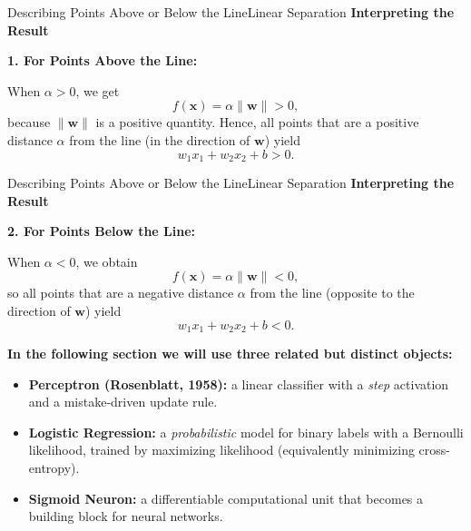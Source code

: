\documentclass[aspectratio=169]{beamer}
\begin{document}
%
%
\begin{frame}{Describing Points Above or Below the Line}{Linear Separation}
\textbf{Interpreting the Result}

\vspace{.3cm}

\textbf{1. For Points Above the Line:}

\vspace{0.3cm}

   When $\alpha > 0$, we get
   $$
   f(\mathbf{x}) = \alpha \|\mathbf{w}\| > 0,
   $$
   because $\|\mathbf{w}\|$ is a positive quantity. Hence, all points that are a positive distance $\alpha$ from the line (in the direction of $ \mathbf{w} $) yield
   $$
   w_1 x_1 + w_2 x_2 + b > 0.
   $$
\end{frame}
%
%
\begin{frame}{Describing Points Above or Below the Line}{Linear Separation}
\textbf{Interpreting the Result}

\vspace{0.3cm}

\textbf{2. For Points Below the Line:}

\vspace{0.3cm}

   When $\alpha < 0$, we obtain
   $$
   f(\mathbf{x}) = \alpha \|\mathbf{w}\| < 0,
   $$
   so all points that are a negative distance $\alpha$ from the line (opposite to the direction of $ \mathbf{w} $) yield
   $$
   w_1 x_1 + w_2 x_2 + b < 0.
   $$
\end{frame}
%
%
\begin{frame}{}
\textbf{In the following section we will use three related but distinct objects:}
\begin{itemize}
  \item \textbf{Perceptron (Rosenblatt, 1958):} a linear classifier with a \emph{step} activation and a mistake-driven update rule.
  \item \textbf{Logistic Regression:} a \emph{probabilistic} model for binary labels with a Bernoulli likelihood, trained by maximizing likelihood (equivalently minimizing cross-entropy).
  \item \textbf{Sigmoid Neuron:} a differentiable computational unit that becomes a building block for neural networks.
\end{itemize}

\end{frame}
%
\end{document}
